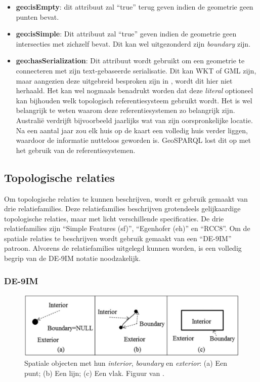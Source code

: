 \begin{itemize}
    \item \textbf{geo:isEmpty}: dit attribuut zal ``true'' terug geven indien de geometrie geen punten bevat.
    \item \textbf{geo:isSimple}: Dit attribuut zal ``true'' geven indien de geometrie geen intersecties met zichzelf bevat. Dit kan wel uitgezonderd zijn \textit{boundary} zijn.
    \item \textbf{geo:hasSerialization}: Dit attribuut wordt gebruikt om een geometrie te connecteren met zijn text-gebaseerde serialisatie. Dit kan WKT of GML zijn, maar aangezien deze uitgebreid besproken zijn in , wordt dit hier niet herhaald. Het kan wel nogmaals benadrukt worden dat deze \textit{literal} optioneel kan bijhouden welk topologisch referentiesysteem gebruikt wordt. Het is wel belangrijk te weten waarom deze referentiesystemen zo belangrijk zijn. Australië verdrijft bijvoorbeeld jaarlijks wat van zijn oorspronkelijke locatie. Na een aantal jaar zou elk huis op de kaart een volledig huis verder liggen, waardoor de informatie nutteloos geworden is. GeoSPARQL lost dit op met het gebruik van de referentiesystemen.
\end{itemize}


\subsection{Topologische relaties}
\label{subsec:topologische_relaties}
Om topologische relaties te kunnen beschrijven, wordt er gebruik gemaakt van drie relatiefamilies. Deze relatiefamilies beschrijven grotendeels gelijkaardige topologische relaties, maar met licht verschillende specificaties. De drie relatiefamilies zijn ``Simple Features (sf)'', ``Egenhofer (eh)'' en ``RCC8''. Om de spatiale relaties te beschrijven wordt gebruik gemaakt van een ``DE-9IM'' patroon. Alvorens de relatiefamilies uitgelegd kunnen worden, is een volledig begrip van de DE-9IM notatie noodzakelijk.

\subsubsection{DE-9IM}
\begin{figure}[ht]
    \centering
    \includegraphics[width=0.9\linewidth]{images/spatial_objects_DE-9IM.png}
    \caption{Spatiale objecten met hun \textit{interior}, \textit{boundary} en \textit{exterior}: (a) Een punt; (b) Een lijn; (c) Een vlak. Figuur van \cite{shen2018classification}.}
    \label{fig:de-9im}
\end{figure}

